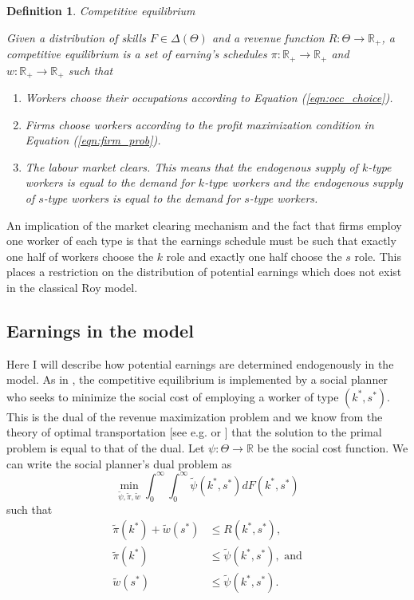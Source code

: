 \documentclass[12 pt]{article}
\newtheorem{definition}{Definition} %
\begin{document}
\begin{definition}{Competitive equilibrium}
	
	
 Given a distribution of skills $F\in \Delta(\Theta)$ and a revenue function $R: \Theta \to \mathbb{R}_+$, a competitive equilibrium is a set of earning's schedules $\pi : \mathbb{R}_+ \to \mathbb{R}_+$ and $w:\mathbb{R}_+ \to \mathbb{R}_+$ such that
 \begin{enumerate}
 	\item Workers choose their occupations according to Equation (\ref{eqn:occ_choice}).
 	\item Firms choose workers according to the profit maximization condition in Equation (\ref{eqn:firm_prob}).
 	\item The labour market clears. This means that the endogenous supply of $k$-type workers is equal to the demand for $k$-type workers and the endogenous supply of $s$-type workers is equal to the demand for $s$-type workers.
 \end{enumerate}
\end{definition}
An implication of the market clearing mechanism and the fact that firms employ one worker of each type is that the earnings schedule must be such that exactly one half of workers choose the $k$ role and exactly one half choose the $s$ role. This places a restriction on the distribution of potential earnings which does not exist in the classical Roy model. 

\subsection{Earnings in the model}

Here I will describe how potential earnings are determined endogenously in the model. As in \citet{mak2025occupational}, the competitive equilibrium is implemented by a social planner who seeks to minimize the social cost of employing a worker of type $(k^*,s^*)$. This is the dual of the revenue maximization problem and we know from the theory of optimal transportation [see e.g. \citet{mccann2010optimal} or \citet{galichon2018optimal}] that the solution to the primal problem is equal to that of the dual. Let $\psi:\Theta \to \mathbb{R}$ be the social cost function. We can write the social planner's dual problem as
\begin{equation*}
	\min_{\tilde{\psi},\tilde{\pi},\tilde{w}} \int_0^\infty \int_0^\infty \tilde{\psi}(k^*,s^*) dF(k^*,s^*)
\end{equation*}
such that
\begin{align*}
	\tilde{\pi}(k^*) + \tilde{w}(s^*) &\leq R(k^*,s^*),\\
	\tilde{\pi}(k^*) &\leq \tilde{\psi}(k^*,s^*), \text{ and}\\
   \tilde{w}(s^*) &\leq\tilde{\psi}(k^*,s^*).
\end{align*}
\end{document}
